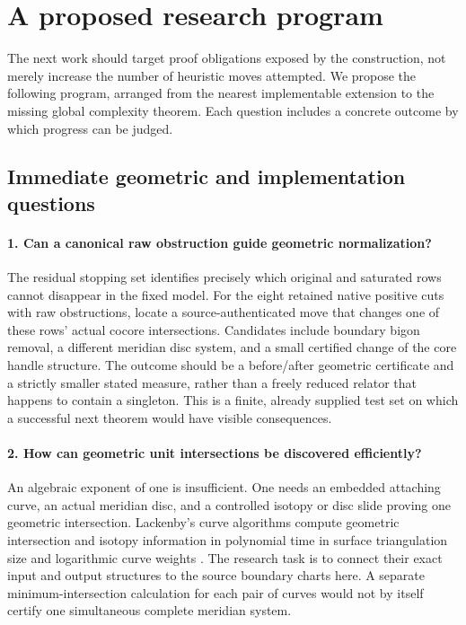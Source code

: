 \section{A proposed research program}
\label{sec:research-program}

The next work should target proof obligations exposed by the construction,
not merely increase the number of heuristic moves attempted.  We propose
the following program, arranged from the nearest implementable extension
to the missing global complexity theorem.  Each question includes a
concrete outcome by which progress can be judged.

\subsection{Immediate geometric and implementation questions}

\paragraph{1. Can a canonical raw obstruction guide geometric normalization?}
The residual stopping set identifies precisely which original and saturated
rows cannot disappear in the fixed model.  For the eight retained native
positive cuts with raw obstructions, locate a source-authenticated move
that changes one of these rows' actual cocore intersections.  Candidates
include boundary bigon removal, a different meridian disc system, and a
small certified change of the core handle structure.  The outcome should
be a before/after geometric certificate and a strictly smaller stated
measure, rather than a freely reduced relator that happens to contain
a singleton.  This is a finite, already supplied test set on which a
successful next theorem would have visible consequences.

\paragraph{2. How can geometric unit intersections be discovered efficiently?}
An algebraic exponent of one is insufficient.  One needs an embedded
attaching curve, an actual meridian disc, and a controlled isotopy or disc
slide proving one geometric intersection.  Lackenby's curve algorithms
compute geometric intersection and isotopy information in polynomial
time in surface triangulation size and logarithmic curve weights
\cite{lackenby-curves}.  The research task is to connect their exact input
and output structures to the source boundary charts here.  A separate
minimum-intersection calculation for each pair of curves would not by
itself certify one simultaneous complete meridian system.

